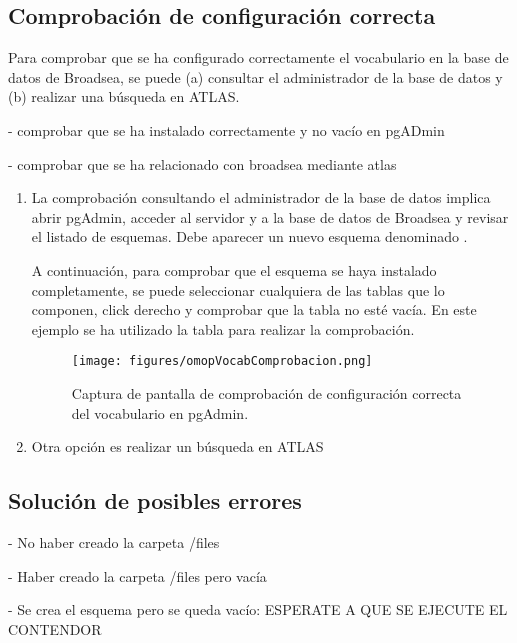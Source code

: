 \subsection{Comprobación de configuración correcta}

Para comprobar que se ha configurado correctamente el vocabulario en la base de datos de Broadsea, se puede (a) consultar el administrador de la base de datos y (b) realizar una búsqueda en ATLAS.

- comprobar que se ha instalado correctamente y no vacío en pgADmin

- comprobar que se ha relacionado con broadsea mediante atlas


\begin{enumerate}

    \item La comprobación consultando el administrador de la base de datos implica abrir pgAdmin, acceder al servidor y a la base de datos de Broadsea y revisar el listado de esquemas. Debe aparecer un nuevo esquema denominado .
    
    A continuación, para comprobar que el esquema se haya instalado completamente, se puede seleccionar cualquiera de las tablas que lo componen, click derecho  y comprobar que la tabla no esté vacía. En este ejemplo se ha utilizado la tabla  para realizar la comprobación.

 \begin{figure}[H]
        \centering
        \texttt{[image: figures/omopVocabComprobacion.png]}
        \caption{Captura de pantalla de comprobación de configuración correcta del vocabulario en pgAdmin.}
        \label{fig:omopVocabComprobacion}
\end{figure}

    \item Otra opción es realizar un búsqueda en ATLAS
    
\end{enumerate}

\subsection{Solución de posibles errores}

- No haber creado la carpeta /files

- Haber creado la carpeta /files pero vacía

- Se crea el esquema pero se queda vacío: ESPERATE A QUE SE EJECUTE EL CONTENDOR 

